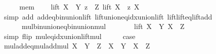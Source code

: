 \begin{isabellebody}
\ \ \isamarkupfalse%
\ \isamarkupfalse%
\ mem\ \isamarkupfalse%
\ {\isachardoublequoteopen}{\isachardot}{\kern0pt}{\isachardot}{\kern0pt}{\isachardot}{\kern0pt}\ {\isacharequal}{\kern0pt}\ lift\ {\isacharparenleft}{\kern0pt}X\ {\isacharasterisk}{\kern0pt}\ Y{\isacharparenright}{\kern0pt}\ {\isacharparenleft}{\kern0pt}{\isasymUnion}z\ {\isasymin}\ Z{\isachardot}{\kern0pt}\ lift\ {\isacharparenleft}{\kern0pt}X\ {\isacharasterisk}{\kern0pt}\ z{\isacharparenright}{\kern0pt}\ X{\isacharparenright}{\kern0pt}{\isachardoublequoteclose}\isanewline
\ \ \ \ \isamarkupfalse%
\ {\isacharparenleft}{\kern0pt}simp\ add{\isacharcolon}{\kern0pt}\ add{\isacharunderscore}{\kern0pt}eq{\isacharunderscore}{\kern0pt}bin{\isacharunderscore}{\kern0pt}union{\isacharunderscore}{\kern0pt}lift\ lift{\isacharunderscore}{\kern0pt}union{\isacharunderscore}{\kern0pt}eq{\isacharunderscore}{\kern0pt}idx{\isacharunderscore}{\kern0pt}union{\isacharunderscore}{\kern0pt}lift\ lift{\isacharunderscore}{\kern0pt}lift{\isacharunderscore}{\kern0pt}eq{\isacharunderscore}{\kern0pt}lift{\isacharunderscore}{\kern0pt}add\isanewline
\ \ \ \ \ \ mul{\isacharunderscore}{\kern0pt}bin{\isacharunderscore}{\kern0pt}union{\isacharunderscore}{\kern0pt}eq{\isacharunderscore}{\kern0pt}bin{\isacharunderscore}{\kern0pt}union{\isacharunderscore}{\kern0pt}mul{\isacharparenright}{\kern0pt}\isanewline
\ \ \isamarkupfalse%
\ \isamarkupfalse%
\ {\isachardoublequoteopen}{\isachardot}{\kern0pt}{\isachardot}{\kern0pt}{\isachardot}{\kern0pt}\ {\isacharequal}{\kern0pt}\ lift\ {\isacharparenleft}{\kern0pt}X\ {\isacharasterisk}{\kern0pt}\ Y{\isacharparenright}{\kern0pt}\ {\isacharparenleft}{\kern0pt}X\ {\isacharasterisk}{\kern0pt}\ Z{\isacharparenright}{\kern0pt}{\isachardoublequoteclose}\ \isamarkupfalse%
\ {\isacharparenleft}{\kern0pt}simp\ flip{\isacharcolon}{\kern0pt}\ mul{\isacharunderscore}{\kern0pt}eq{\isacharunderscore}{\kern0pt}idx{\isacharunderscore}{\kern0pt}union{\isacharunderscore}{\kern0pt}lift{\isacharunderscore}{\kern0pt}mul{\isacharparenright}{\kern0pt}\isanewline
\ \ \isamarkupfalse%
\ \isamarkupfalse%
\ {\isacharquery}{\kern0pt}case\ \isacommand{{\isachardot}{\kern0pt}}\isamarkupfalse%
\isanewline
{}\isamarkupfalse%
%
\endisatagproof
{\isafoldproof}%
%
\isadelimproof
\isanewline
%
\endisadelimproof
\isanewline
{}\isamarkupfalse%
\ mul{\isacharunderscore}{\kern0pt}add{\isacharunderscore}{\kern0pt}eq{\isacharunderscore}{\kern0pt}mul{\isacharunderscore}{\kern0pt}add{\isacharunderscore}{\kern0pt}mul{\isacharcolon}{\kern0pt}\ {\isachardoublequoteopen}X\ {\isacharasterisk}{\kern0pt}\ {\isacharparenleft}{\kern0pt}Y\ {\isacharplus}{\kern0pt}\ Z{\isacharparenright}{\kern0pt}\ {\isacharequal}{\kern0pt}\ X\ {\isacharasterisk}{\kern0pt}\ Y\ {\isacharplus}{\kern0pt}\ X\ {\isacharasterisk}{\kern0pt}\ Z{\isachardoublequoteclose}\isanewline

\end{isabellebody}
